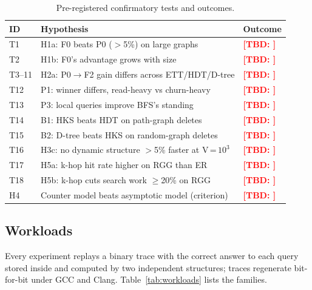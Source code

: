 \documentclass[conference]{IEEEtran}
\newcommand{\TBD}[1]{\textcolor{red}{\textbf{[TBD: #1]}}}
\begin{document}
\begin{table}[t]
\caption{Pre-registered confirmatory tests and outcomes.}
\label{tab:hyp}
\centering\scriptsize
\begin{tabular}{@{}lp{4.1cm}l@{}}
\toprule
ID & Hypothesis & Outcome\\
\midrule
T1 & H1a: F0 beats P0 ($>$5\%) on large graphs & \TBD{}\\
T2 & H1b: F0's advantage grows with size & \TBD{}\\
T3--11 & H2a: P0$\to$F2 gain differs across ETT/HDT/D-tree & \TBD{}\\
T12 & P1: winner differs, read-heavy vs churn-heavy & \TBD{}\\
T13 & P3: local queries improve BFS's standing & \TBD{}\\
T14 & B1: HKS beats HDT on path-graph deletes & \TBD{}\\
T15 & B2: D-tree beats HKS on random-graph deletes & \TBD{}\\
T16 & H3c: no dynamic structure $>$5\% faster at V\,=\,$10^3$ & \TBD{}\\
T17 & H5a: k-hop hit rate higher on RGG than ER & \TBD{}\\
T18 & H5b: k-hop cuts search work $\geq$20\% on RGG & \TBD{}\\
H4 & Counter model beats asymptotic model (criterion) & \TBD{}\\
\bottomrule
\end{tabular}
\end{table}

\subsection{Workloads}
Every experiment replays a binary trace with the correct answer to each query stored inside and computed by two independent structures; traces regenerate bit-for-bit under GCC and Clang. Table~\ref{tab:workloads} lists the families.
\end{document}

